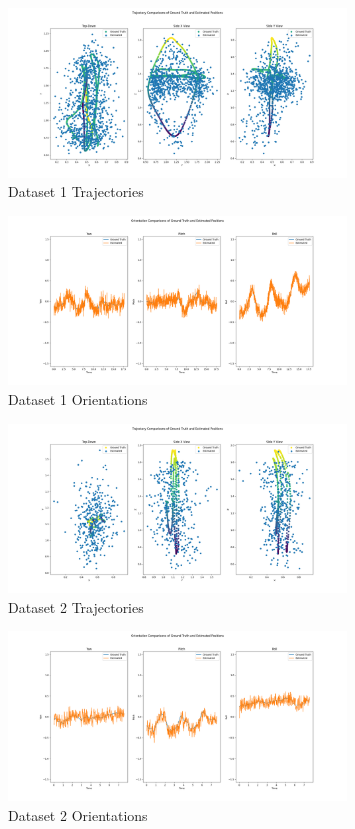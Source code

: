 \documentclass{article}
\begin{document}
\begin{figure}[H]
    \centering
    \includegraphics[width=0.8\textwidth]{./imgs/task1/studentdata1_positions.png}
    \caption{Dataset 1 Trajectories}
\end{figure}

\begin{figure}[H]
    \centering
    \includegraphics[width=0.8\textwidth]{./imgs/task1/studentdata1_orientations.png}
    \caption{Dataset 1 Orientations}
\end{figure}

\begin{figure}[H]
    \centering
    \includegraphics[width=0.8\textwidth]{./imgs/task1/studentdata2_positions.png}
    \caption{Dataset 2 Trajectories}
\end{figure}

\begin{figure}[H]
    \centering
    \includegraphics[width=0.8\textwidth]{./imgs/task1/studentdata2_orientations.png}
    \caption{Dataset 2 Orientations}
\end{figure}
\end{document}
